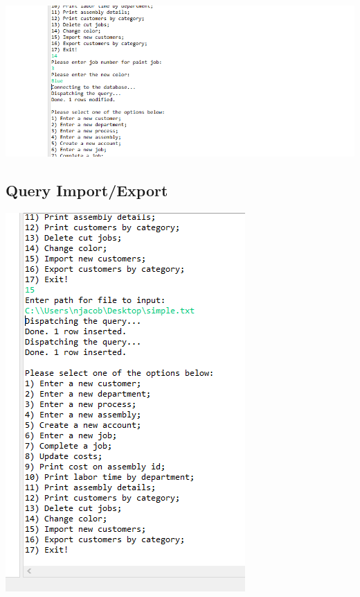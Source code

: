 \documentclass[11pt]{article}
\begin{document}
\includegraphics[width = \textwidth]{paintColor2.png}
\subsection{Query Import/Export}

\includegraphics[width = \textwidth]{insert.png}
\end{document}

